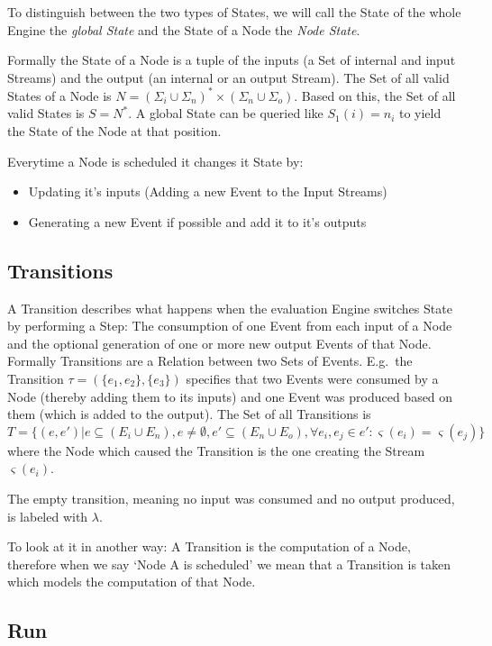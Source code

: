 To distinguish between the two types of States, we will call the State of the whole Engine the \emph{global State} and the State of a Node the \emph{Node State}.

Formally the State of a Node is a tuple of the inputs (a Set of internal and input Streams) and the output (an internal or an output Stream).
The Set of all valid States of a Node is \(N = {(\Sigma_i \cup \Sigma_n)}^*\times(\Sigma_n \cup \Sigma_o)\).
Based on this, the Set of all valid States is \(S = N^*\).
A global State can be queried like \(S_1(i) = n_i\) to yield the State of the Node at that position.

Everytime a Node is scheduled it changes it State by:

\begin{itemize}
  \item Updating it's inputs (Adding a new Event to the Input Streams)
  \item Generating a new Event if possible and add it to it's outputs
\end{itemize}

\subsection{Transitions}
\label{sec:concepts:def:transitions}

A Transition describes what happens when the evaluation Engine switches State by performing a Step:
The consumption of one Event from each input of a Node and the optional generation of one or more new output Events of that Node.
Formally Transitions are a Relation between two Sets of Events.
E.g.\ the Transition \(\tau = (\{e_1,e_2\}, \{e_3\})\) specifies that two Events were consumed by a Node (thereby adding them to its inputs) and one Event was produced based on them (which is added to the output).
The Set of all Transitions is
\[
  T = \{(e, e') | e \subseteq (E_i \cup E_n),e \neq \emptyset, e' \subseteq (E_n \cup E_o), \forall e_i, e_j \in e': \varsigma(e_i) = \varsigma(e_j)\}
\]
where the Node which caused the Transition is the one creating the Stream \(\varsigma(e_i)\).

The empty transition, meaning no input was consumed and no output produced, is labeled with \(\lambda\).

To look at it in another way: A Transition is the computation of a Node, therefore when we say `Node A is scheduled' we mean that a Transition is taken which models the computation of that Node.

\subsection{Run}
\label{sec:concepts:def:run}

